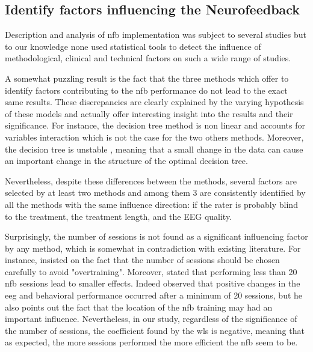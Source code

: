 
\subsection{Identify factors influencing the Neurofeedback}

Description and analysis of \gls{nfb} implementation was subject to several studies \citep{Arns2014, Enriquez2017, Vernon2004, Jeunet2018} 
but to our knowledge none used statistical tools to detect the influence of methodological, clinical and technical factors 
on such a wide range of studies. 

A somewhat puzzling result is the fact that the three methods which offer to identify factors contributing to the \gls{nfb} 
performance do not lead to the exact same results. These discrepancies are clearly explained by the varying hypothesis 
of these models and actually offer interesting insight into the results and their significance. For instance, the decision tree method is non 
linear and accounts for variables interaction which is not the case for the two others methods. Moreover, the decision tree is unstable 
\citep{dwyer2007}, meaning that a small change in the data can cause an important change in the structure of the optimal decision tree.

Nevertheless, despite these differences between the methods, several factors are selected by at least two methods and among them 3 are
consistently identified by all the methods with the same influence direction: if the rater is probably blind to the treatment, the
treatment length, and the EEG quality. 


Surprisingly, the number of sessions is not found as a significant influencing factor by any method, 
which is somewhat in contradiction with existing literature. For instance, \citet{Enriquez2017} insisted on the 
fact that the number of sessions should be chosen carefully to avoid "overtraining". Moreover, \citet{Arns2014} stated that 
performing less than 20 \gls{nfb} sessions lead to smaller effects. Indeed \citet{Vernon2004} observed that positive 
changes in the \gls{eeg} and behavioral performance occurred after a minimum of 20 sessions, but he also points out the fact that the
location of the \gls{nfb} training may had an important influence. Nevertheless, in our study, regardless of the significance of 
the number of sessions, the coefficient found by the \gls{wls} is negative, meaning that as expected,
the more sessions performed the more efficient the \gls{nfb} seem to be. 

